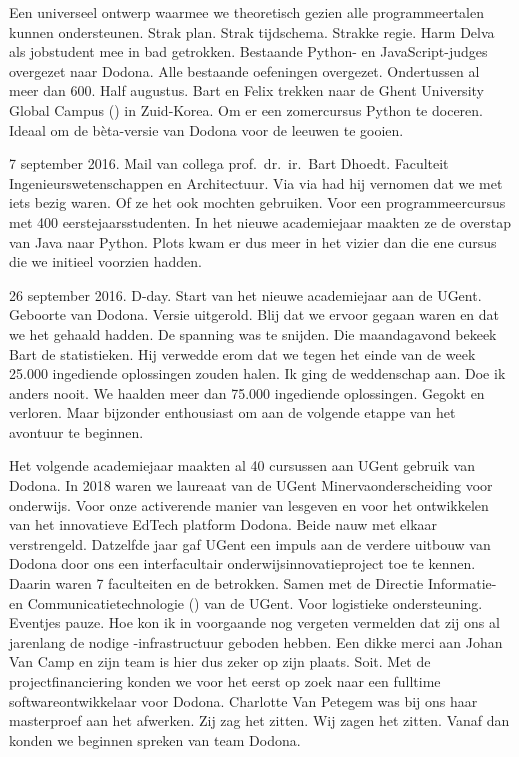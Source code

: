 Een universeel ontwerp waarmee we theoretisch gezien alle programmeertalen kunnen ondersteunen.
Strak plan.
Strak tijdschema.
Strakke regie.
Harm Delva als jobstudent mee in bad getrokken.
Bestaande Python- en JavaScript-judges overgezet naar Dodona.
Alle bestaande oefeningen overgezet.
Ondertussen al meer dan 600.
Half augustus.
Bart en Felix trekken naar de Ghent University Global Campus () in Zuid-Korea.
Om er een zomercursus Python te doceren.
Ideaal om de bèta-versie van Dodona voor de leeuwen te gooien.

7 september 2016.
Mail van collega prof.\ dr.\ ir.\ Bart Dhoedt.
Faculteit Ingenieurswetenschappen en Architectuur.
Via via had hij vernomen dat we met iets bezig waren.
Of ze het ook mochten gebruiken.
Voor een programmeercursus met 400 eerstejaarsstudenten.
In het nieuwe academiejaar maakten ze de overstap van Java naar Python.
Plots kwam er dus meer in het vizier dan die ene cursus die we initieel voorzien hadden.

26 september 2016.
D-day.
Start van het nieuwe academiejaar aan de UGent.
Geboorte van Dodona.
Versie  uitgerold.
Blij dat we ervoor gegaan waren en dat we het gehaald hadden.
De spanning was te snijden.
Die maandagavond bekeek Bart de statistieken.
Hij verwedde erom dat we tegen het einde van de week 25.000 ingediende oplossingen zouden halen.
Ik ging de weddenschap aan.
Doe ik anders nooit.
We haalden meer dan 75.000 ingediende oplossingen.
Gegokt en verloren.
Maar bijzonder enthousiast om aan de volgende etappe van het avontuur te beginnen.

Het volgende academiejaar maakten al 40 cursussen aan UGent gebruik van Dodona.
In 2018 waren we laureaat van de UGent Minervaonderscheiding voor onderwijs.
Voor onze activerende manier van lesgeven en voor het ontwikkelen van het innovatieve EdTech platform Dodona.
Beide nauw met elkaar verstrengeld.
Datzelfde jaar gaf UGent een impuls aan de verdere uitbouw van Dodona door ons een interfacultair onderwijsinnovatieproject toe te kennen.
Daarin waren 7 faculteiten en de  betrokken.
Samen met de Directie Informatie- en Communicatietechnologie () van de UGent.
Voor logistieke ondersteuning.
Eventjes pauze.
Hoe kon ik in voorgaande nog vergeten vermelden dat zij ons al jarenlang de nodige -infrastructuur geboden hebben.
Een dikke merci aan Johan Van Camp en zijn team is hier dus zeker op zijn plaats.
Soit.
Met de projectfinanciering konden we voor het eerst op zoek naar een fulltime softwareontwikkelaar voor Dodona.
Charlotte Van Petegem was bij ons haar masterproef aan het afwerken.
Zij zag het zitten.
Wij zagen het zitten.
Vanaf dan konden we beginnen spreken van team Dodona.

